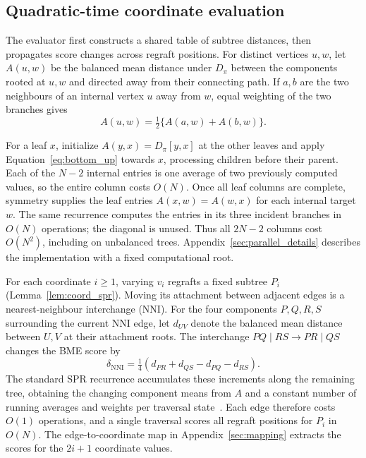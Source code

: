 \documentclass[11pt,a4paper]{article}
\makeatletter
\DeclareRobustCommand{\_}{\ifmmode\nfss@text{\textunderscore}\else\textunderscore\allowbreak\fi}
\theoremstyle{definition}
\makeatother
\begin{document}
\begin{samepage}
\subsection{Quadratic-time coordinate evaluation}

The evaluator first constructs a shared table of subtree distances, then propagates score changes across regraft positions.
For distinct vertices $u,w$, let $A(u,w)$ be the balanced mean distance under $D_\pi$ between the components rooted at $u,w$ and directed away from their connecting path.
If $a,b$ are the two neighbours of an internal vertex $u$ away from $w$, equal weighting of the two branches gives
\begin{equation}
 A(u,w)=\tfrac12\{A(a,w)+A(b,w)\}.
 \label{eq:bottom_up}
\end{equation}
\end{samepage}

For a leaf $x$, initialize $A(y,x)=D_\pi[y,x]$ at the other leaves and apply Equation~\eqref{eq:bottom_up} towards $x$, processing children before their parent.
Each of the $N-2$ internal entries is one average of two previously computed values, so the entire column costs $O(N)$.
Once all leaf columns are complete, symmetry supplies the leaf entries $A(x,w)=A(w,x)$ for each internal target $w$.
The same recurrence computes the entries in its three incident branches in $O(N)$ operations; the diagonal is unused.
Thus all $2N-2$ columns cost $O(N^2)$, including on unbalanced trees.
Appendix~\ref{sec:parallel_details} describes the implementation with a fixed computational root.

For each coordinate $i\geq1$, varying $v_i$ regrafts a fixed subtree $P_i$ (Lemma~\ref{lem:coord_spr}).
Moving its attachment between adjacent edges is a nearest-neighbour interchange (NNI).
For the four components $P,Q,R,S$ surrounding the current NNI edge, let $d_{UV}$ denote the balanced mean distance between $U,V$ at their attachment roots.
The interchange $PQ\mid RS\to PR\mid QS$ changes the BME score by
\begin{equation}
 \delta_{\mathrm{NNI}}=\tfrac14(d_{PR}+d_{QS}-d_{PQ}-d_{RS}).
 \label{eq:nni_increment}
\end{equation}
The standard SPR recurrence accumulates these increments along the remaining tree, obtaining the changing component means from $A$ and a constant number of running averages and weights per traversal state~\cite{hordijk2005spr}.
Each edge therefore costs $O(1)$ operations, and a single traversal scores all regraft positions for $P_i$ in $O(N)$.
The edge-to-coordinate map in Appendix~\ref{sec:mapping} extracts the scores for the $2i+1$ coordinate values.
\end{document}
